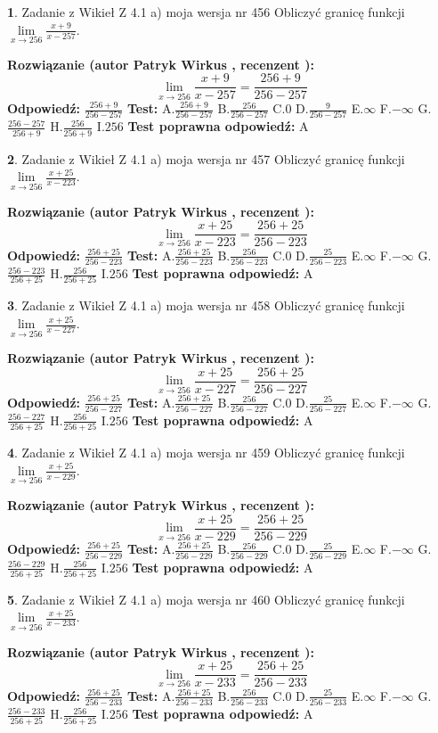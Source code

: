 \documentclass[12pt, a4paper]{article}
\theoremstyle{definition} %
\newtheorem{zad}{}
\newcommand{\zadStart}[1]{\begin{zad}#1\newline}
\newcommand{\zadStop}{\end{zad}}
\newcommand{\rozwStart}[2]{\noindent \textbf{Rozwiązanie (autor #1 , recenzent #2): }\newline}
\newcommand{\rozwStop}{\newline}
\newcommand{\odpStart}{\noindent \textbf{Odpowiedź:}\newline}
\newcommand{\odpStop}{\newline}
\newcommand{\testStart}{\noindent \textbf{Test:}\newline}
\newcommand{\testStop}{\newline}
\newcommand{\kluczStart}{\noindent \textbf{Test poprawna odpowiedź:}\newline}
\newcommand{\kluczStop}{\newline}
\begin{document}
\zadStart{Zadanie z Wikieł Z 4.1 a) moja wersja nr 456}
Obliczyć granicę funkcji $\lim\limits_{x\to256}\frac{x+9}{x-257}$.
\zadStop
\rozwStart{Patryk Wirkus}{}
$$\lim\limits_{x\to256}\frac{x+9}{x-257} = \frac{256+9}{256-257}$$
\rozwStop
\odpStart
$\frac{256+9}{256-257}$
\odpStop
\testStart
A.$\frac{256+9}{256-257}$
B.$\frac{256}{256-257}$
C.$0$
D.$\frac{9}{256-257}$
E.$\infty$
F.$-\infty$
G.$\frac{256-257}{256+9}$
H.$\frac{256}{256+9}$
I.$256$
\testStop
\kluczStart
A
\kluczStop



\zadStart{Zadanie z Wikieł Z 4.1 a) moja wersja nr 457}
Obliczyć granicę funkcji $\lim\limits_{x\to256}\frac{x+25}{x-223}$.
\zadStop
\rozwStart{Patryk Wirkus}{}
$$\lim\limits_{x\to256}\frac{x+25}{x-223} = \frac{256+25}{256-223}$$
\rozwStop
\odpStart
$\frac{256+25}{256-223}$
\odpStop
\testStart
A.$\frac{256+25}{256-223}$
B.$\frac{256}{256-223}$
C.$0$
D.$\frac{25}{256-223}$
E.$\infty$
F.$-\infty$
G.$\frac{256-223}{256+25}$
H.$\frac{256}{256+25}$
I.$256$
\testStop
\kluczStart
A
\kluczStop



\zadStart{Zadanie z Wikieł Z 4.1 a) moja wersja nr 458}
Obliczyć granicę funkcji $\lim\limits_{x\to256}\frac{x+25}{x-227}$.
\zadStop
\rozwStart{Patryk Wirkus}{}
$$\lim\limits_{x\to256}\frac{x+25}{x-227} = \frac{256+25}{256-227}$$
\rozwStop
\odpStart
$\frac{256+25}{256-227}$
\odpStop
\testStart
A.$\frac{256+25}{256-227}$
B.$\frac{256}{256-227}$
C.$0$
D.$\frac{25}{256-227}$
E.$\infty$
F.$-\infty$
G.$\frac{256-227}{256+25}$
H.$\frac{256}{256+25}$
I.$256$
\testStop
\kluczStart
A
\kluczStop



\zadStart{Zadanie z Wikieł Z 4.1 a) moja wersja nr 459}
Obliczyć granicę funkcji $\lim\limits_{x\to256}\frac{x+25}{x-229}$.
\zadStop
\rozwStart{Patryk Wirkus}{}
$$\lim\limits_{x\to256}\frac{x+25}{x-229} = \frac{256+25}{256-229}$$
\rozwStop
\odpStart
$\frac{256+25}{256-229}$
\odpStop
\testStart
A.$\frac{256+25}{256-229}$
B.$\frac{256}{256-229}$
C.$0$
D.$\frac{25}{256-229}$
E.$\infty$
F.$-\infty$
G.$\frac{256-229}{256+25}$
H.$\frac{256}{256+25}$
I.$256$
\testStop
\kluczStart
A
\kluczStop



\zadStart{Zadanie z Wikieł Z 4.1 a) moja wersja nr 460}
Obliczyć granicę funkcji $\lim\limits_{x\to256}\frac{x+25}{x-233}$.
\zadStop
\rozwStart{Patryk Wirkus}{}
$$\lim\limits_{x\to256}\frac{x+25}{x-233} = \frac{256+25}{256-233}$$
\rozwStop
\odpStart
$\frac{256+25}{256-233}$
\odpStop
\testStart
A.$\frac{256+25}{256-233}$
B.$\frac{256}{256-233}$
C.$0$
D.$\frac{25}{256-233}$
E.$\infty$
F.$-\infty$
G.$\frac{256-233}{256+25}$
H.$\frac{256}{256+25}$
I.$256$
\testStop
\kluczStart
A
\kluczStop
\end{document}
